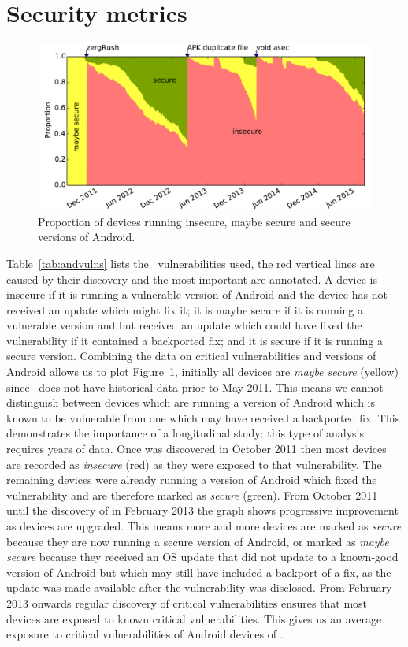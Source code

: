 \section{Security metrics}\label{sec:androidvulnerability}
\begin{figure}
\centering
\includegraphics[width=\columnwidth]{figures/proportioninsecure}
\caption{Proportion of devices running insecure, maybe secure and secure versions of Android.}
\label{fig:proportioninsecure}
\end{figure}
Table~\ref{tab:andvulns} lists the \daNumVulnsUsed\ vulnerabilities used, the red vertical lines are caused by their discovery and the most important are annotated.
A device is insecure if it is running a vulnerable version of Android and the device has not received an update which might fix it;
it is maybe secure if it is running a vulnerable version and but received an update which could have fixed the vulnerability if it contained a backported fix;
and it is secure if it is running a secure version.
Combining the data on critical vulnerabilities and versions of Android allows us to plot Figure~\ref{fig:proportioninsecure}, initially all devices are \emph{maybe secure} (yellow) since \da\ does not have historical data prior to May 2011.
This means we cannot distinguish between devices which are running a version of Android which is known to be vulnerable from one which may have received a backported fix.
This demonstrates the importance of a longitudinal study: this type of analysis requires years of data.
Once  was discovered in October 2011 then most devices are recorded as \emph{insecure} (red) as they were exposed to that vulnerability.
The remaining devices were already running a version of Android which fixed the  vulnerability and are therefore marked as \emph{secure} (green).
From October 2011 until the discovery of  in February 2013 the graph shows progressive improvement as devices are upgraded.
This means more and more devices are marked as \emph{secure} because they are now running a secure version of Android, or marked as \emph{maybe secure} because they received an OS update that did not update to a known-good version of Android but which may still have included a backport of a fix, as the update was made available after the vulnerability was disclosed.
From February 2013 onwards regular discovery of critical vulnerabilities ensures that most devices are exposed to known critical vulnerabilities.
This gives us an average exposure to critical vulnerabilities of Android devices of \daMeanInsecurityPerc.

